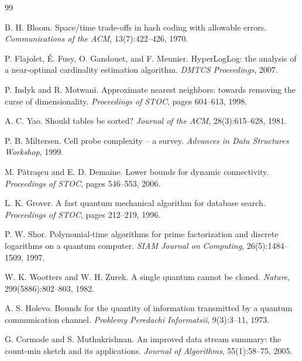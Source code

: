 \documentclass[11pt,letterpaper]{article}
\begin{document}

\begin{thebibliography}{99}

B. H. Bloom.
\newblock Space/time trade-offs in hash coding with allowable errors.
\newblock \textit{Communications of the ACM}, 13(7):422--426, 1970.

P. Flajolet, É. Fusy, O. Gandouet, and F. Meunier.
\newblock HyperLogLog: the analysis of a near-optimal cardinality estimation algorithm.
\newblock \textit{DMTCS Proceedings}, 2007.

P. Indyk and R. Motwani.
\newblock Approximate nearest neighbors: towards removing the curse of dimensionality.
\newblock \textit{Proceedings of STOC}, pages 604--613, 1998.

A. C. Yao.
\newblock Should tables be sorted?
\newblock \textit{Journal of the ACM}, 28(3):615--628, 1981.

P. B. Miltersen.
\newblock Cell probe complexity -- a survey.
\newblock \textit{Advances in Data Structures Workshop}, 1999.

M. Pătraşcu and E. D. Demaine.
\newblock Lower bounds for dynamic connectivity.
\newblock \textit{Proceedings of STOC}, pages 546--553, 2006.

L. K. Grover.
\newblock A fast quantum mechanical algorithm for database search.
\newblock \textit{Proceedings of STOC}, pages 212--219, 1996.

P. W. Shor.
\newblock Polynomial-time algorithms for prime factorization and discrete logarithms on a quantum computer.
\newblock \textit{SIAM Journal on Computing}, 26(5):1484--1509, 1997.

W. K. Wootters and W. H. Zurek.
\newblock A single quantum cannot be cloned.
\newblock \textit{Nature}, 299(5886):802--803, 1982.

A. S. Holevo.
\newblock Bounds for the quantity of information transmitted by a quantum communication channel.
\newblock \textit{Problemy Peredachi Informatsii}, 9(3):3--11, 1973.

G. Cormode and S. Muthukrishnan.
\newblock An improved data stream summary: the count-min sketch and its applications.
\newblock \textit{Journal of Algorithms}, 55(1):58--75, 2005.


\end{thebibliography}
\end{document}
